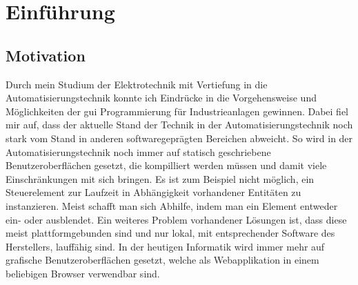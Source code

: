 \chapter{Einführung}\label{chapter:entry}
\section{Motivation}
Durch mein Studium der Elektrotechnik mit Vertiefung in die Automatisierungstechnik konnte ich Eindrücke in die Vorgehensweise und 
Möglichkeiten der \ac{gui} Programmierung für Industrieanlagen gewinnen. %
Dabei fiel mir auf, dass der aktuelle Stand der Technik in  der Automatisierungstechnik noch stark 
vom Stand in anderen softwaregeprägten Bereichen abweicht.
So wird in der Automatisierungstechnik noch immer auf statisch geschriebene Benutzeroberflächen gesetzt, 
die kompilliert werden müssen und damit viele Einschränkungen mit sich bringen.
Es ist zum Beispiel nicht möglich, ein Steuerelement zur Laufzeit in Abhängigkeit vorhandener Entitäten zu instanzieren. 
Meist schafft man sich Abhilfe, indem man ein Element entweder ein- oder ausblendet.
Ein weiteres Problem vorhandener Lösungen ist, dass diese meist plattformgebunden sind und nur lokal, 
mit entsprechender Software des Herstellers, lauffähig sind.
In der heutigen Informatik wird immer mehr auf grafische Benutzeroberflächen gesetzt, 
welche als Webapplikation in einem beliebigen Browser verwendbar sind.

